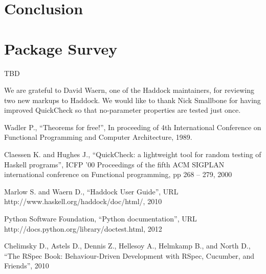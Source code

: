 \documentclass[preprint]{sigplanconf}
\begin{document}
\section{Conclusion}

\appendix

\section{Package Survey}

TBD

\acks

We are grateful to David Waern, 
one of the Haddock maintainers, 
for reviewing two new markups to Haddock.
We would like to thank
Nick Smallbone for having improved QuickCheck so that no-parameter properties are tested just once.






\begin{thebibliography}{}
\softraggedright

Wadler P.,
``Theorems for free!'',
In proceeding of 4th International Conference on Functional Programming and Computer Architecture, 1989.

Claessen K. and Hughes J.,
``QuickCheck: a lightweight tool for random testing of Haskell programs'',
ICFP '00 Proceedings of the fifth ACM SIGPLAN international conference on Functional programming,
pp 268 -- 279,
2000

Marlow S. and Waern D.,
``Haddock User Guide'',
URL http://www.haskell.org/haddock/doc/html/,
2010

Python Software Foundation,
``Python documentation'',
URL http://docs.python.org/library/doctest.html,
2012

Chelimsky D.,
Astels D., Dennis Z., Hellesoy A., Helmkamp B., and North D.,
``The RSpec Book: Behaviour-Driven
Development with RSpec, Cucumber, and Friends'',
2010

\end{thebibliography}
\end{document}
